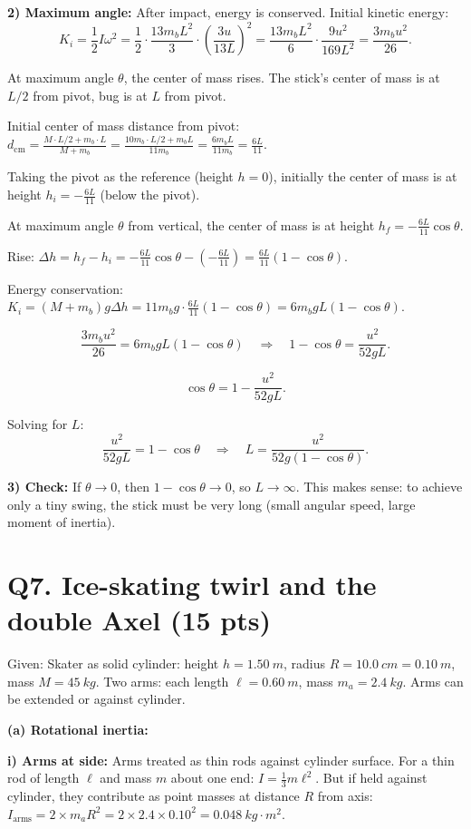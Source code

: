 \documentclass[11pt]{article}
\newcommand{\ans}[1]{\boxed{\displaystyle #1}}
\begin{document}
\textbf{2) Maximum angle:} After impact, energy is conserved. Initial kinetic energy:
\[ K_i = \frac{1}{2}I\omega^2 = \frac{1}{2} \cdot \frac{13m_b L^2}{3} \cdot \left(\frac{3u}{13L}\right)^2 = \frac{13m_b L^2}{6} \cdot \frac{9u^2}{169L^2} = \frac{3m_b u^2}{26}. \]

At maximum angle $\theta$, the center of mass rises. The stick's center of mass is at $L/2$ from pivot, bug is at $L$ from pivot.

Initial center of mass distance from pivot: $d_{\text{cm}} = \frac{M \cdot L/2 + m_b \cdot L}{M + m_b} = \frac{10m_b \cdot L/2 + m_b L}{11m_b} = \frac{6m_b L}{11m_b} = \frac{6L}{11}$.

Taking the pivot as the reference (height $h = 0$), initially the center of mass is at height $h_i = -\frac{6L}{11}$ (below the pivot).

At maximum angle $\theta$ from vertical, the center of mass is at height $h_f = -\frac{6L}{11}\cos\theta$.

Rise: $\Delta h = h_f - h_i = -\frac{6L}{11}\cos\theta - \left(-\frac{6L}{11}\right) = \frac{6L}{11}(1 - \cos\theta)$.

Energy conservation: $K_i = (M + m_b)g\Delta h = 11m_b g \cdot \frac{6L}{11}(1 - \cos\theta) = 6m_b g L(1 - \cos\theta)$.

\[ \frac{3m_b u^2}{26} = 6m_b g L(1 - \cos\theta) \quad\Rightarrow\quad 1 - \cos\theta = \frac{u^2}{52gL}. \]

\[ \cos\theta = 1 - \frac{u^2}{52gL}. \]

Solving for $L$:
\[ \frac{u^2}{52gL} = 1 - \cos\theta \quad\Rightarrow\quad L = \ans{\frac{u^2}{52g(1 - \cos\theta)}}. \]

\textbf{3) Check:} If $\theta \to 0$, then $1 - \cos\theta \to 0$, so $L \to \infty$. This makes sense: to achieve only a tiny swing, the stick must be very long (small angular speed, large moment of inertia).

\section*{Q7. Ice-skating twirl and the double Axel (15 pts)}
Given: Skater as solid cylinder: height $h = \SI{1.50}{m}$, radius $R = \SI{10.0}{cm} = \SI{0.10}{m}$, mass $M = \SI{45}{kg}$. Two arms: each length $\ell = \SI{0.60}{m}$, mass $m_a = \SI{2.4}{kg}$. Arms can be extended or against cylinder.

\textbf{(a) Rotational inertia:}

\textbf{i) Arms at side:} Arms treated as thin rods against cylinder surface. For a thin rod of length $\ell$ and mass $m$ about one end: $I = \frac{1}{3}m\ell^2$. But if held against cylinder, they contribute as point masses at distance $R$ from axis: $I_{\text{arms}} = 2 \times m_a R^2 = 2 \times 2.4 \times 0.10^2 = \SI{0.048}{kg\cdot m^2}$.
\end{document}

